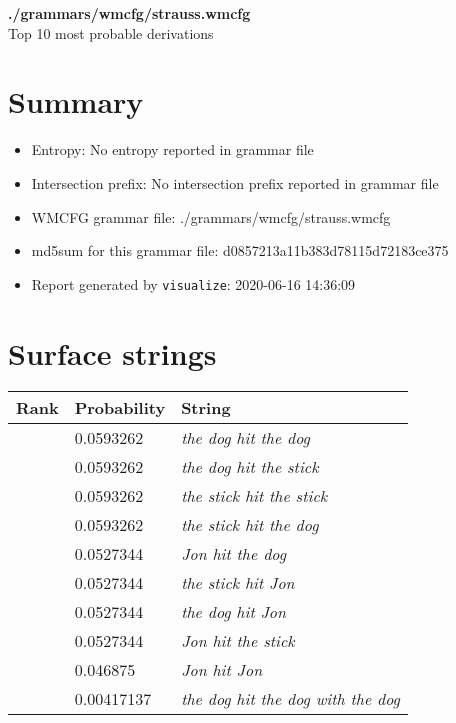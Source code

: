 \documentclass[11pt]{article}
\begin{document}
\begin{center}
{\huge \textbf{./grammars/wmcfg/strauss.wmcfg}} \\[0.5em]
{\normalsize Top 10 most probable derivations}
\end{center}

\section{Summary}
\begin{itemize}
	\item Entropy: No entropy reported in grammar file
	\item Intersection prefix: No intersection prefix reported in grammar file
	\item WMCFG grammar file: ./grammars/wmcfg/strauss.wmcfg
	\item md5sum for this grammar file: d0857213a11b383d78115d72183ce375
	\item Report generated by \texttt{visualize}: 2020-06-16 14:36:09
\end{itemize}

\section{Surface strings}
\hspace{1em}
\renewcommand{\arraystretch}{1.15}
\newcommand\rownumber{\stepcounter{rownumber}\arabic{rownumber}}
\begin{tabular}{l l l}
	\hline
	 Rank & Probability & String \\
	\hline
\rownumber & 0.0593262 & \textit{the dog hit the dog} \\
\rownumber & 0.0593262 & \textit{the dog hit the stick} \\
\rownumber & 0.0593262 & \textit{the stick hit the stick} \\
\rownumber & 0.0593262 & \textit{the stick hit the dog} \\
\rownumber & 0.0527344 & \textit{Jon hit the dog} \\
\rownumber & 0.0527344 & \textit{the stick hit Jon} \\
\rownumber & 0.0527344 & \textit{the dog hit Jon} \\
\rownumber & 0.0527344 & \textit{Jon hit the stick} \\
\rownumber & 0.046875 & \textit{Jon hit Jon} \\
\rownumber & 0.00417137 & \textit{the dog hit the dog with the dog} \\
	\hline
\end{tabular}
\pagebreak
\end{document}
